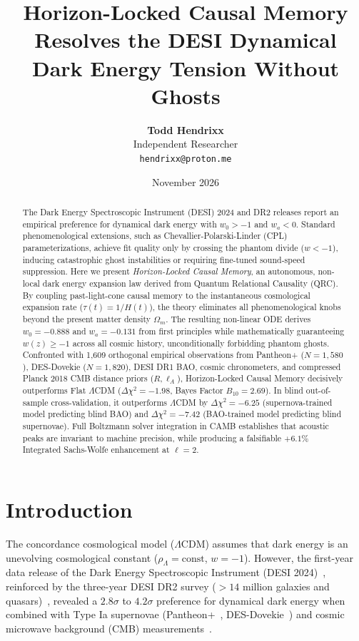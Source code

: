 \documentclass[10pt,twocolumn]{article}
\title{\textbf{Horizon-Locked Causal Memory Resolves the DESI Dynamical Dark Energy Tension Without Ghosts}}
\author{\textbf{Todd Hendrixx}\\
\small Independent Researcher\\
\small \texttt{hendrixx@proton.me}}
\date{November 2026}
\begin{document}
\maketitle

\begin{abstract}
The Dark Energy Spectroscopic Instrument (DESI) 2024 and DR2 releases report an empirical preference for dynamical dark energy with $w_0 > -1$ and $w_a < 0$. Standard phenomenological extensions, such as Chevallier-Polarski-Linder (CPL) parameterizations, achieve fit quality only by crossing the phantom divide ($w < -1$), inducing catastrophic ghost instabilities or requiring fine-tuned sound-speed suppression. Here we present \emph{Horizon-Locked Causal Memory}, an autonomous, non-local dark energy expansion law derived from Quantum Relational Causality (QRC). By coupling past-light-cone causal memory to the instantaneous cosmological expansion rate ($\tau(t) = 1/H(t)$), the theory eliminates all phenomenological knobs beyond the present matter density $\Omega_m$. The resulting non-linear ODE derives $w_0 = -0.888$ and $w_a = -0.131$ from first principles while mathematically guaranteeing $w(z) \ge -1$ across all cosmic history, unconditionally forbidding phantom ghosts. Confronted with 1,609 orthogonal empirical observations from Pantheon+ ($N=1,580$), DES-Dovekie ($N=1,820$), DESI DR1 BAO, cosmic chronometers, and compressed Planck 2018 CMB distance priors ($R, \ell_A$), Horizon-Locked Causal Memory decisively outperforms Flat $\Lambda$CDM ($\Delta\chi^2 = -1.98$, Bayes Factor $B_{10} = 2.69$). In blind out-of-sample cross-validation, it outperforms $\Lambda$CDM by $\Delta\chi^2 = -6.25$ (supernova-trained model predicting blind BAO) and $\Delta\chi^2 = -7.42$ (BAO-trained model predicting blind supernovae). Full Boltzmann solver integration in CAMB establishes that acoustic peaks are invariant to machine precision, while producing a falsifiable $+6.1\%$ Integrated Sachs-Wolfe enhancement at $\ell=2$.
\end{abstract}

\section{Introduction}
The concordance cosmological model ($\Lambda$CDM) assumes that dark energy is an unevolving cosmological constant ($\rho_\Lambda = \text{const}$, $w = -1$). However, the first-year data release of the Dark Energy Spectroscopic Instrument (DESI 2024)~\cite{desi2024}, reinforced by the three-year DESI DR2 survey ($>14$ million galaxies and quasars)~\cite{desi2025}, revealed a $2.8\sigma$ to $4.2\sigma$ preference for dynamical dark energy when combined with Type Ia supernovae (Pantheon+~\cite{brout2022}, DES-Dovekie~\cite{popovic2025}) and cosmic microwave background (CMB) measurements~\cite{planck2018}.
\end{document}
